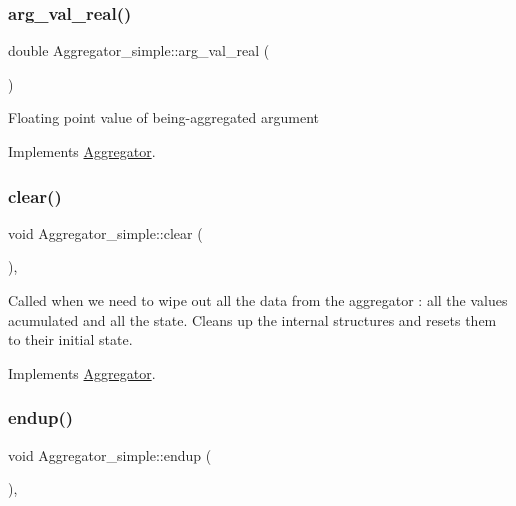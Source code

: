 \subsubsection{\texorpdfstring{arg\+\_\+val\+\_\+real()}{arg\_val\_real()}}
{\footnotesize\ttfamily double Aggregator\+\_\+simple\+::arg\+\_\+val\+\_\+real (\begin{DoxyParamCaption}{ }\end{DoxyParamCaption})\hspace{0.3cm}{\ttfamily [virtual]}}

Floating point value of being-\/aggregated argument 

Implements \mbox{\hyperlink{classAggregator_addca16d20f7cc2640f3843c2c5e7596d}{Aggregator}}.

\mbox{\label{classAggregator__simple_a1bc4a3b483c68b07ac0c2472e868d1a2}} 
\subsubsection{\texorpdfstring{clear()}{clear()}}
{\footnotesize\ttfamily void Aggregator\+\_\+simple\+::clear (\begin{DoxyParamCaption}{ }\end{DoxyParamCaption})\hspace{0.3cm}{\ttfamily [inline]}, {\ttfamily [virtual]}}

Called when we need to wipe out all the data from the aggregator \+: all the values acumulated and all the state. Cleans up the internal structures and resets them to their initial state. 

Implements \mbox{\hyperlink{classAggregator_ad416a800e9cdec7908dd3e9bdffa70e5}{Aggregator}}.

\mbox{\label{classAggregator__simple_a57c8435c2131160c58f8c1e6cce37542}} 
\subsubsection{\texorpdfstring{endup()}{endup()}}
{\footnotesize\ttfamily void Aggregator\+\_\+simple\+::endup (\begin{DoxyParamCaption}{ }\end{DoxyParamCaption})\hspace{0.3cm}{\ttfamily [inline]}, {\ttfamily [virtual]}}

